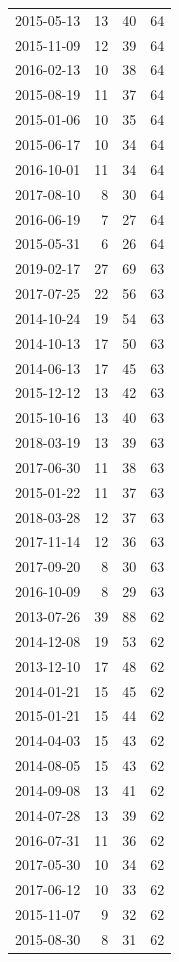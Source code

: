 \begin{tabular}{lrrr}
2015-05-13 & 13 & 40 & 64 \\
2015-11-09 & 12 & 39 & 64 \\
2016-02-13 & 10 & 38 & 64 \\
2015-08-19 & 11 & 37 & 64 \\
2015-01-06 & 10 & 35 & 64 \\
2015-06-17 & 10 & 34 & 64 \\
2016-10-01 & 11 & 34 & 64 \\
2017-08-10 & 8 & 30 & 64 \\
2016-06-19 & 7 & 27 & 64 \\
2015-05-31 & 6 & 26 & 64 \\
2019-02-17 & 27 & 69 & 63 \\
2017-07-25 & 22 & 56 & 63 \\
2014-10-24 & 19 & 54 & 63 \\
2014-10-13 & 17 & 50 & 63 \\
2014-06-13 & 17 & 45 & 63 \\
2015-12-12 & 13 & 42 & 63 \\
2015-10-16 & 13 & 40 & 63 \\
2018-03-19 & 13 & 39 & 63 \\
2017-06-30 & 11 & 38 & 63 \\
2015-01-22 & 11 & 37 & 63 \\
2018-03-28 & 12 & 37 & 63 \\
2017-11-14 & 12 & 36 & 63 \\
2017-09-20 & 8 & 30 & 63 \\
2016-10-09 & 8 & 29 & 63 \\
2013-07-26 & 39 & 88 & 62 \\
2014-12-08 & 19 & 53 & 62 \\
2013-12-10 & 17 & 48 & 62 \\
2014-01-21 & 15 & 45 & 62 \\
2015-01-21 & 15 & 44 & 62 \\
2014-04-03 & 15 & 43 & 62 \\
2014-08-05 & 15 & 43 & 62 \\
2014-09-08 & 13 & 41 & 62 \\
2014-07-28 & 13 & 39 & 62 \\
2016-07-31 & 11 & 36 & 62 \\
2017-05-30 & 10 & 34 & 62 \\
2017-06-12 & 10 & 33 & 62 \\
2015-11-07 & 9 & 32 & 62 \\
2015-08-30 & 8 & 31 & 62 \\

\end{tabular}
